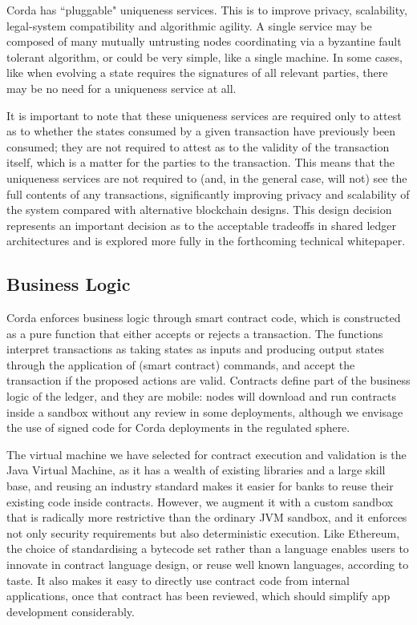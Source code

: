 \documentclass{article}
\begin{document}
Corda has ``pluggable" uniqueness services. This is to improve privacy, scalability, legal-system compatibility\cite{EUC} and algorithmic agility. A single service may be composed of many mutually untrusting nodes coordinating via a byzantine fault tolerant algorithm, or could be very simple, like a single machine. In some cases, like when evolving a state requires the signatures of all relevant parties, there may be no need for a uniqueness service at all. 

It is important to note that these uniqueness services are required only to attest as to whether the states consumed by a given transaction have previously been consumed; they are not required to attest as to the validity of the transaction itself, which is a matter for the parties to the transaction. This means that the uniqueness services are not required to (and, in the general case, will not) see the full contents of any transactions, significantly improving privacy and scalability of the system compared with alternative blockchain designs.  This design decision represents an important decision as to the acceptable tradeoffs in shared ledger architectures and is explored more fully in the forthcoming technical whitepaper.

\subsection{Business Logic}
Corda enforces business logic through smart contract code, which is constructed as a pure function that either accepts or rejects a transaction. The functions interpret transactions as taking states as inputs and producing output states through the application of (smart contract) commands, and accept the transaction if the proposed actions are valid. Contracts define part of the business logic of the ledger, and they are mobile: nodes will download and run contracts inside a sandbox without any review in some deployments, although we envisage the use of signed code for Corda deployments in the regulated sphere. 

The virtual machine we have selected for contract execution and validation is the Java Virtual Machine\cite{JVM}, as it has a wealth of existing libraries and a large skill base, and reusing an industry standard makes it easier for banks to reuse their existing code inside contracts. However, we augment it with a custom sandbox that is radically more restrictive than the ordinary JVM sandbox, and it enforces not only security requirements but also deterministic execution. Like Ethereum, the choice of standardising a bytecode set rather than a language enables users to innovate in contract language design, or reuse well known languages, according to taste. It also makes it easy to directly use contract code from internal applications, once that contract has been reviewed, which should simplify app development considerably.
\end{document}
